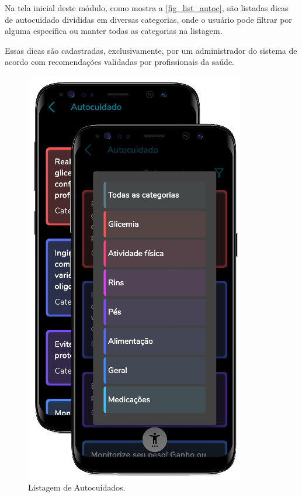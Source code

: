 Na tela inicial deste módulo, como mostra a \autoref{fig_list_autoc}, são listadas dicas de autocuidado
divididas em diversas categorias, onde o usuário pode filtrar por alguma específica ou manter todas as
categorias na listagem.

Essas dicas são cadastradas, exclusivamente, por um administrador do sistema de acordo com recomendações
validadas por profissionais da saúde.

\begin{figure}[htb]
    \centering
    \begin{minipage}{0.5\textwidth}
        \centering
        \caption{Listagem de Autocuidados.}\label{fig_list_autoc}
        \includegraphics[scale=0.6]{Imagens/desenvolvimento/app/list_autoc.png}
    \end{minipage}
    \hfill
    \begin{minipage}{0.45\textwidth}
        \centering

\end{minipage}
\end{figure}
